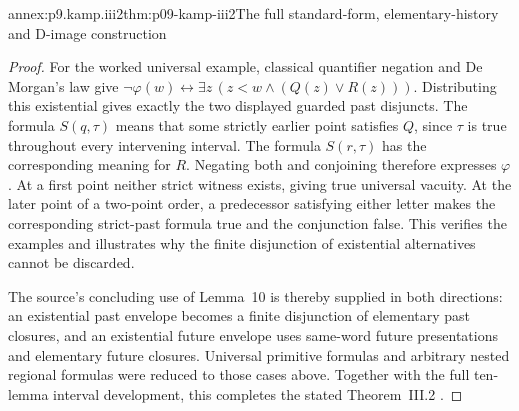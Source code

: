 \begin{annexitem}{annex:p9.kamp.iii2}{thm:p09-kamp-iii2}{The full standard-form, elementary-history and D-image construction}
\begin{proof}
For the worked universal example, classical quantifier negation and
De Morgan's law give
\(\neg\varphi(w)\longleftrightarrow\exists z\,(z<w\land(Q(z)\lor R(z)))\).
Distributing this existential gives exactly the two displayed guarded
past disjuncts. The formula \(S(q,\tau)\) means that some
strictly earlier point satisfies \(Q\), since \(\tau\)
is true throughout every intervening interval. The formula
\(S(r,\tau)\) has the corresponding meaning for \(R\).
Negating both and conjoining therefore expresses \(\varphi\).
At a first point neither strict witness exists, giving true
universal vacuity. At the later point of a two-point order, a
predecessor satisfying either letter makes the corresponding
strict-past formula true and the conjunction false. This verifies
the examples and illustrates why the finite disjunction of
existential alternatives cannot be discarded.

The source's concluding use of Lemma~10 is thereby supplied in both
directions: an existential past envelope becomes a finite disjunction
of elementary past closures, and an existential future envelope
uses same-word future presentations and elementary future closures.
Universal primitive formulas and arbitrary nested regional formulas
were reduced to those cases above. Together with the full ten-lemma
interval development, this completes the stated Theorem~III.2
\cite[ch.~III, pp.~60--62, 93--94]{Kamp1968}.
\end{proof}
\end{annexitem}
